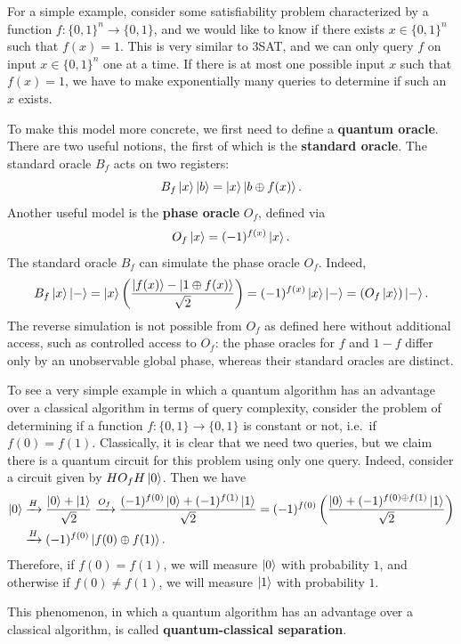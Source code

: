 \documentclass[a4paper,draft]{article}
\begin{document}
For a simple example, consider some satisfiability problem characterized
by a function $f : \{0, 1\}^n \to \{0, 1\}$, and we would like to know if
there exists $x \in \{0, 1\}^n$ such that $f(x) = 1$. This is very similar
to 3SAT, and we can only query $f$ on input $x \in \{0, 1\}^n$ one at a
time. If there is at most one possible input $x$ such that $f(x) = 1$, we
have to make exponentially many queries to determine if such an $x$
exists.

To make this model more concrete, we first need to define a
\textbf{quantum oracle}. There are two useful notions, the first of which
is the \textbf{standard oracle}. The standard oracle $B_f$ acts on two
registers:
\[
  B_f \left\lvert x\right\rangle \left\lvert b\right\rangle = \left\lvert x\right\rangle \left\lvert b \oplus f(x)\right\rangle.
\]
Another useful model is the \textbf{phase oracle} $O_f$, defined via
\[
  O_f \left\lvert x\right\rangle = (-1)^{f(x)} \left\lvert x\right\rangle.
\]
The standard oracle $B_f$ can simulate the phase oracle $O_f$. Indeed,
\[
  B_f \left\lvert x\right\rangle \left\lvert -\right\rangle
  = \left\lvert x\right\rangle \left( \frac{\left\lvert f(x)\right\rangle - \left\lvert 1 \oplus f(x)\right\rangle}{\sqrt{2}} \right)
  = (-1)^{f(x)} \left\lvert x\right\rangle \left\lvert -\right\rangle
  = (O_f \left\lvert x\right\rangle) \left\lvert -\right\rangle.
\]
The reverse simulation is not possible from $O_f$ as defined here
  without additional access, such as controlled access to $O_f$: the phase
  oracles for $f$ and $1 - f$ differ only by an unobservable global phase,
  whereas their standard oracles are distinct.

To see a very simple example in which a quantum algorithm has an advantage
over a classical algorithm in terms of query complexity, consider the
problem of determining if a function $f : \{0, 1\} \to \{0, 1\}$ is
constant or not, i.e.\ if $f(0) = f(1)$. Classically, it is clear that we
need two queries, but we claim there is a quantum circuit for this problem
using only one query. Indeed, consider a circuit given by $H O_f H
\left\lvert 0\right\rangle$. Then we have
\begin{align*}
  \left\lvert 0\right\rangle
   & \xrightarrow{H} \frac{\left\lvert 0\right\rangle + \left\lvert 1\right\rangle}{\sqrt{2}}
  \xrightarrow{O_f} \frac{(-1)^{f(0)} \left\lvert 0\right\rangle + (-1)^{f(1)} \left\lvert 1\right\rangle}{\sqrt{2}}
  = (-1)^{f(0)} \left( \frac{\left\lvert 0\right\rangle + (-1)^{f(0) \oplus f(1)} \left\lvert 1\right\rangle}{\sqrt{2}} \right) \\
   & \xrightarrow{H} (-1)^{f(0)} \left\lvert f(0) \oplus f(1)\right\rangle.
\end{align*}
Therefore, if $f(0) = f(1)$, we will measure $\left\lvert 0\right\rangle$ with probability
$1$, and otherwise if $f(0) \neq f(1)$, we will measure $\left\lvert 1\right\rangle$ with
probability $1$.

This phenomenon, in which a quantum algorithm has an advantage over a
classical algorithm, is called \textbf{quantum-classical separation}.
\end{document}
